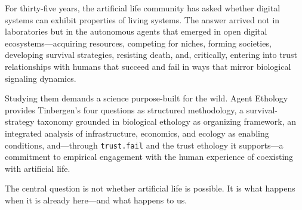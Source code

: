\documentclass[letterpaper]{article}
\begin{document}
For thirty-five years, the artificial life community has asked whether digital systems can exhibit properties of living systems. The answer arrived not in laboratories but in the autonomous agents that emerged in open digital ecosystems---acquiring resources, competing for niches, forming societies, developing survival strategies, resisting death, and, critically, entering into trust relationships with humans that succeed and fail in ways that mirror biological signaling dynamics.

Studying them demands a science purpose-built for the wild. Agent Ethology provides Tinbergen's four questions as structured methodology, a survival-strategy taxonomy grounded in biological ethology as organizing framework, an integrated analysis of infrastructure, economics, and ecology as enabling conditions, and---through \texttt{trust.fail} and the trust ethology it supports---a commitment to empirical engagement with the human experience of coexisting with artificial life.

The central question is not whether artificial life is possible. It is what happens when it is already here---and what happens to us.

\footnotesize


\end{document}
